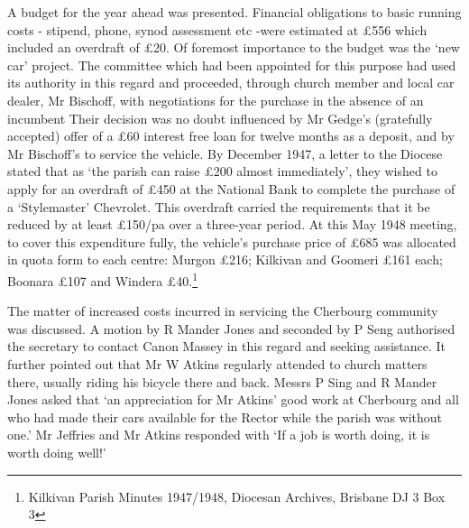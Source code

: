 A budget for the year ahead was presented. Financial obligations to basic running costs - stipend, phone, synod assessment etc -were estimated at \pounds556 which included an overdraft of \pounds20. Of foremost importance to the budget was the `new car' project. The committee which had been appointed for this purpose had used its authority in this regard and proceeded, through church member and local car dealer, Mr Bischoff, with negotiations for the purchase in the absence of an incumbent Their decision was no doubt influenced by Mr Gedge's (gratefully accepted) offer of a \pounds60 interest free loan for twelve months as a deposit, and by Mr Bischoff's to service the vehicle. By December 1947, a letter to the Diocese stated that as `the parish can raise \pounds200 almost immediately', they wished to apply for an overdraft of \pounds450 at the National Bank to complete the purchase of a `Stylemaster' Chevrolet. This overdraft carried the requirements that it be reduced by at least \pounds150/pa over a three-year period. At this May 1948 meeting, to cover this expenditure fully, the vehicle's purchase price of \pounds685 was allocated in quota form to each centre: Murgon \pounds216; Kilkivan and Goomeri \pounds161 each; Boonara \pounds107 and Windera \pounds40.\footnote{Kilkivan Parish Minutes 1947/1948, Diocesan Archives, Brisbane DJ 3 Box 3}


The matter of increased costs incurred in servicing the Cherbourg community was discussed. A motion by R Mander Jones and seconded by P Seng authorised the secretary to contact Canon Massey in this regard and seeking assistance. It further pointed out that Mr W Atkins regularly attended to church matters there, usually riding his bicycle there and back. Messrs P Sing and R Mander Jones asked that `an appreciation for Mr Atkins' good work at Cherbourg and all who had made their cars available for the Rector while the parish was without one.' Mr Jeffries and Mr Atkins responded with `If a job is worth doing, it is worth doing well!'



